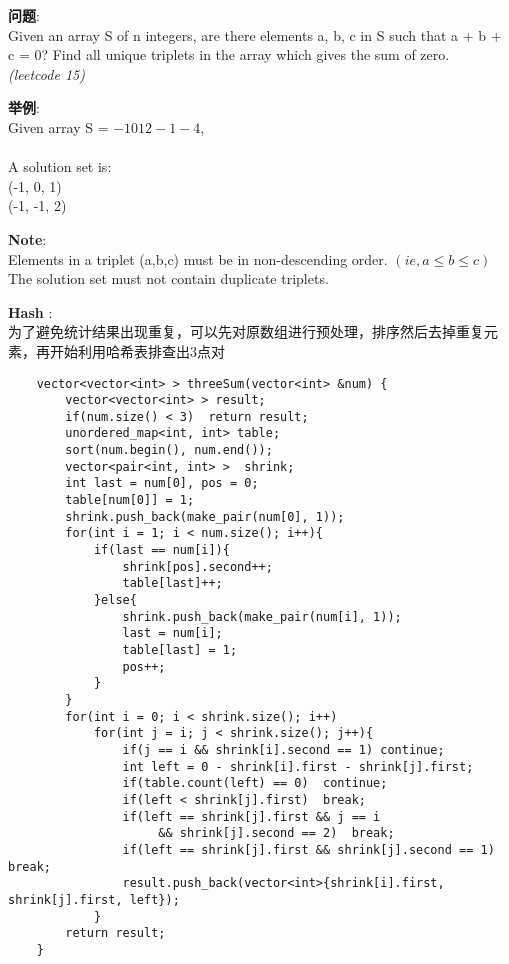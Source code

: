     
\begin{description}
    \item{\textbf{问题}}:\\
Given an array S of n integers, are there elements a, b, c in S such that a + b + c = 0? Find all unique triplets in the array which gives the sum of zero.\\
\textit{(leetcode 15)}
    \item{\textbf{举例}}:\\
Given array S = ${-1 0 1 2 -1 -4}$,\\
\\
    A solution set is:\\
    (-1, 0, 1)\\
    (-1, -1, 2)
    \item{\textbf{Note}}:\\
Elements in a triplet (a,b,c) must be in non-descending order. $(ie, a ≤ b ≤ c)$ \\
The solution set must not contain duplicate triplets.
    \item{\textbf{Hash}} : 
    \\为了避免统计结果出现重复，可以先对原数组进行预处理，排序然后去掉重复元素，再开始利用哈希表排查出3点对
    \begin{lstlisting}
	vector<vector<int> > threeSum(vector<int> &num) {
		vector<vector<int> > result;
		if(num.size() < 3)	return result;
		unordered_map<int, int> table;
		sort(num.begin(), num.end());
		vector<pair<int, int> >  shrink;
		int last = num[0], pos = 0;
		table[num[0]] = 1;
		shrink.push_back(make_pair(num[0], 1));
		for(int i = 1; i < num.size(); i++){
			if(last == num[i]){
				shrink[pos].second++;
				table[last]++;
			}else{
				shrink.push_back(make_pair(num[i], 1));
				last = num[i];
				table[last] = 1;
				pos++;
			}				
		}
		for(int i = 0; i < shrink.size(); i++)
			for(int j = i; j < shrink.size(); j++){
				if(j == i && shrink[i].second == 1) continue;
				int left = 0 - shrink[i].first - shrink[j].first;
				if(table.count(left) == 0)	continue;
				if(left < shrink[j].first)	break;
				if(left == shrink[j].first && j == i
					 && shrink[j].second == 2)	break;
				if(left == shrink[j].first && shrink[j].second == 1)	break;
				result.push_back(vector<int>{shrink[i].first, shrink[j].first, left});
			}
		return result;
	}
    \end{lstlisting}
\end{description}
